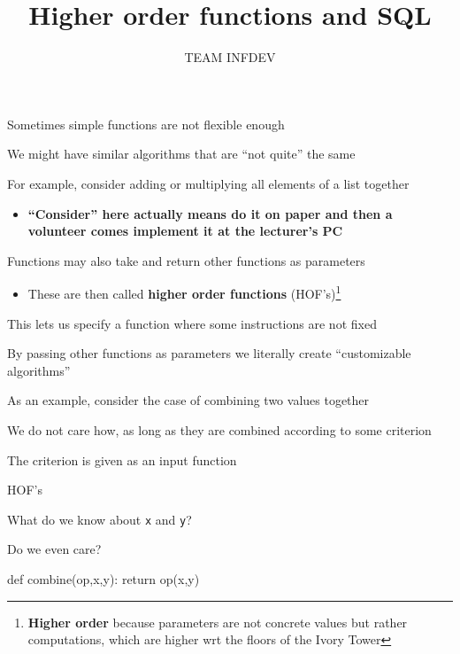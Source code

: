 \documentclass{beamer}
\title{Higher order functions and SQL}
\author{TEAM INFDEV}
\institute{Hogeschool Rotterdam \\ 
Rotterdam, Netherlands}
\date{}
\begin{document}
\maketitle

\begin{slide}{
\item Sometimes simple functions are not flexible enough
\item We might have similar algorithms that are ``not quite'' the same
\item For example, consider adding or multiplying all elements of a list together
\begin{itemize}
\item \textbf{``Consider'' here actually means do it on paper and then a volunteer comes implement it at the lecturer's PC}
\end{itemize}
}\end{slide}

\begin{slide}{
\item Functions may also take and return other functions as parameters
\begin{itemize}
\item These are then called \textbf{higher order functions} (HOF's)\footnote{\pause \textbf{Higher order} because parameters are not concrete values but rather computations, which are higher wrt the floors of the Ivory Tower}
\end{itemize}
\item This lets us specify a function where some instructions are not fixed
\item By passing other functions as parameters we literally create ``customizable algorithms''
}\end{slide}

\begin{slide}{
\item As an example, consider the case of combining two values together
\item We do not care how, as long as they are combined according to some criterion
\item The criterion is given as an input function
}\end{slide}

\begin{frame}[fragile]{HOF's}
\begin{codewithblock}{\item What do we know about \texttt{x} and \texttt{y}? \item Do we even care?}
def combine(op,x,y):
  return op(x,y)
\end{codewithblock}
\end{frame}
\end{document}
